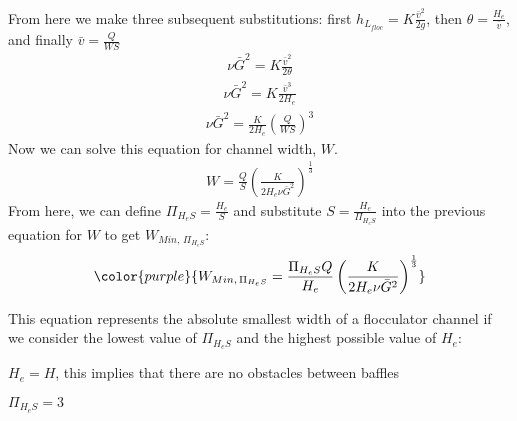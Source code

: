 \documentclass[letterpaper,10pt,english]{sphinxmanual}
\begin{document}
From here we make three subsequent substitutions: first
\(h_{L_{floc}} = K \frac{\bar v^2}{2g}\), then
\(\theta = \frac{H_e}{\bar v}\), and finally
\(\bar v = \frac{Q}{WS}\)
\begin{equation}\label{equation:Flocculation/Floc_Derivations:Flocculation/Floc_Derivations:1}
\begin{split}\nu \bar G^2 = K \frac{\bar v^2}{2 \theta}\end{split}
\end{equation}\begin{equation}\label{equation:Flocculation/Floc_Derivations:Flocculation/Floc_Derivations:2}
\begin{split}\nu \bar G^2 = K \frac{\bar v^3}{2 H_e}\end{split}
\end{equation}\begin{equation}\label{equation:Flocculation/Floc_Derivations:Flocculation/Floc_Derivations:3}
\begin{split}\nu \bar G^2 = \frac{K}{2 H_e} \left( \frac{Q}{WS} \right)^3\end{split}
\end{equation}
Now we can solve this equation for channel width, \(W\).
\begin{equation}\label{equation:Flocculation/Floc_Derivations:Flocculation/Floc_Derivations:4}
\begin{split}W = \frac{Q}{S}\left( \frac{K}{2 H_e \nu \bar G^2} \right)^\frac{1}{3}\end{split}
\end{equation}
From here, we can define \(\Pi_{H_eS} = \frac{H_e}{S}\) and
substitute \(S = \frac{H_e}{\Pi_{H_eS}}\) into the previous equation
for \(W\) to get \(W_{Min, \, \Pi_{H_eS}}\):
\begin{equation}\label{equation:Flocculation/Floc_Derivations:Flocculation/Floc_Derivations:5}
\begin{split}\color{purple}{
W_{Min, \, \Pi_{H_eS}} = \frac{\Pi_{H_eS}Q}{H_e}\left( \frac{K}{2 H_e \nu \bar G^2} \right)^\frac{1}{3}
}\end{split}
\end{equation}
\begin{DUlineblock}{0em}
\item[] This equation represents the absolute smallest width of a flocculator
channel if we consider the lowest value of \(\Pi_{H_eS}\) and the
highest possible value of \(H_e\):
\item[] \(H_e = H\), this implies that there are no obstacles between
baffles
\item[] \(\Pi_{H_eS} = 3\)
\end{DUlineblock}
\end{document}
